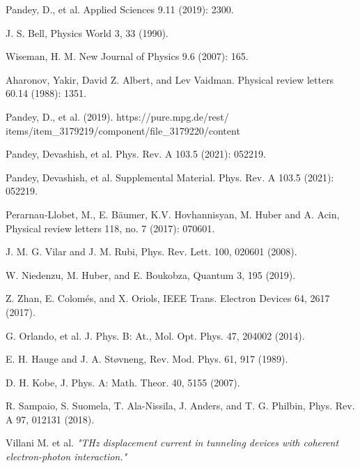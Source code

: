 \documentclass[11pt, a4paper]{article} %
\begin{document}
\begin{thebibliography}{1}
{
Pandey, D., et al. Applied Sciences 9.11 (2019): 2300.

J. S. Bell, Physics World 3, 33 (1990).

Wiseman, H. M. New Journal of Physics 9.6 (2007): 165.

Aharonov, Yakir, David Z. Albert, and Lev Vaidman. Physical review letters 60.14 (1988): 1351.

Pandey, D., et al. (2019). https://pure.mpg.de/rest/\\ items/item\_3179219/component/file\_3179220/content

Pandey, Devashish, et al. Phys. Rev. A 103.5 (2021): 052219.

Pandey, Devashish, et al. Supplemental Material. Phys. Rev. A 103.5 (2021): 052219.

Perarnau-Llobet, M., E. Bäumer, K.V. Hovhannisyan, M. Huber and A. Acin, Physical review letters 118, no. 7 (2017): 070601.

J. M. G. Vilar and J. M. Rubi, Phys. Rev. Lett. 100, 020601 (2008).

W. Niedenzu, M. Huber, and E. Boukobza, Quantum 3, 195 (2019).

Z. Zhan, E. Colomés, and X. Oriols, IEEE Trans. Electron Devices 64, 2617 (2017).

G. Orlando, et al. J. Phys. B: At., Mol. Opt. Phys. 47, 204002 (2014).

E. H. Hauge and J. A. Støvneng, Rev. Mod. Phys. 61, 917 (1989).

D. H. Kobe, J. Phys. A: Math. Theor. 40, 5155 (2007).

R. Sampaio, S. Suomela, T. Ala-Nissila, J. Anders, and T. G. Philbin, Phys. Rev. A 97, 012131 (2018).

Villani M. et al. {\em "THz displacement current in tunneling devices with coherent electron-photon
interaction."}

}
\end{thebibliography}
\end{document}

